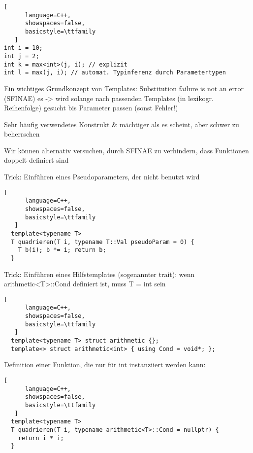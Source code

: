 \documentclass[10pt]{article}
\begin{document}
\begin{lstlisting}[
      language=C++,
      showspaces=false,
      basicstyle=\ttfamily
   ]
int i = 10;
int j = 2;
int k = max<int>(j, i); // explizit
int l = max(j, i); // automat. Typinferenz durch Parametertypen
\end{lstlisting}

\begin{itemize*}
  \item Ein wichtiges Grundkonzept von Templates: Substitution failure is not an error (SFINAE) es -> wird solange nach passenden Templates (in lexikogr. Reihenfolge) gesucht bis Parameter passen (sonst Fehler!)
  \item Sehr häufig verwendetes Konstrukt \& mächtiger als es scheint, aber schwer zu beherrschen
  \begin{itemize*}
    \item Wir können alternativ versuchen, durch SFINAE zu verhindern, dass Funktionen doppelt definiert sind
    \item Trick: Einführen eines Pseudoparameters, der nicht benutzt wird
    \begin{lstlisting}[
      language=C++,
      showspaces=false,
      basicstyle=\ttfamily
   ]
  template<typename T>
  T quadrieren(T i, typename T::Val pseudoParam = 0) {
    T b(i); b *= i; return b;
  }
  \end{lstlisting}
    
    \item Trick: Einführen eines Hilfstemplates (sogenannter trait): wenn arithmetic<T>::Cond definiert ist, muss T = int sein
    \begin{lstlisting}[
      language=C++,
      showspaces=false,
      basicstyle=\ttfamily
   ]
  template<typename T> struct arithmetic {};
  template<> struct arithmetic<int> { using Cond = void*; };
  \end{lstlisting}
    
    \item Definition einer Funktion, die nur für int instanziiert werden kann:
    \begin{lstlisting}[
      language=C++,
      showspaces=false,
      basicstyle=\ttfamily
   ]
  template<typename T>
  T quadrieren(T i, typename arithmetic<T>::Cond = nullptr) {
    return i * i;
  }
  \end{lstlisting}
  \end{itemize*}
\end{itemize*}
\end{document}
